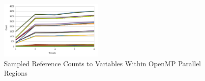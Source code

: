 \begin{figure}
\begin{center}
\includegraphics[width=0.45\textwidth]{images/cp2k-omp-inc-full.pdf}
\end{center}
\caption{Sampled Reference Counts to Variables Within OpenMP Parallel Regions}
\label{fig:openmp-refcount}
\end{figure}
